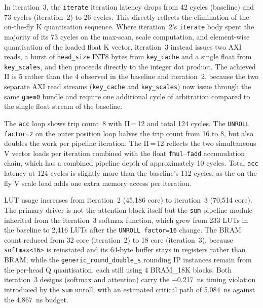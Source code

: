 In iteration~3, the \texttt{iterate} iteration latency drops from 42 cycles (baseline) and 73
cycles (iteration~2) to 26 cycles. This directly reflects the
elimination of the on-the-fly K quantisation sequence. Where
iteration~2's \texttt{iterate} body spent the majority of its 73
cycles on the max-scan, scale computation, and element-wise
quantisation of the loaded float K vector, iteration~3 instead
issues two AXI reads, a burst of \texttt{head\_size} INT8 bytes
from \texttt{key\_cache} and a single float from
\texttt{key\_scales}, and then proceeds directly to the integer dot
product. The achieved II is 5 rather than the 4 observed in the
baseline and iteration~2, because the two separate AXI read streams
(\texttt{key\_cache} and \texttt{key\_scales}) now issue through the
same \texttt{gmem0} bundle and require one additional cycle of
arbitration compared to the single float stream of the baseline.

The \texttt{acc} loop shows trip count~8 with II\,=\,12 and total
124 cycles. The \texttt{UNROLL factor=2} on the outer position loop
halves the trip count from 16 to 8, but also doubles the work per
pipeline iteration. The II\,=\,12 reflects the two simultaneous V
vector loads per iteration combined with the float
\texttt{fmul}--\texttt{fadd} accumulation chain, which has a combined
pipeline depth of approximately 10 cycles. Total \texttt{acc} latency
at 124 cycles is slightly more than the baseline's 112 cycles, as the
on-the-fly V scale load adds one extra memory access per iteration.

LUT usage increases
from iteration~2 (45,186 core) to iteration~3 (70,514 core). The
primary driver is not the attention block itself but the
\texttt{sum} pipeline module inherited from the iteration~3 softmax
function, which grew from 233 LUTs in the baseline to 2,416 LUTs
after the \texttt{UNROLL factor=16} change. The BRAM count reduced
from 32 core (iteration~2) to 18 core (iteration~3), because
\texttt{softmax<16>} is reinstated and its 64-byte buffer stays in
registers rather than BRAM, while the \texttt{generic\_round\_double\_s}
rounding IP instances remain from the per-head Q quantisation, each
still using 4 BRAM\_18K blocks. Both iteration~3 designs
(softmax and attention) carry the \SI{-0.217}{\nano\second} timing
violation introduced by the \texttt{sum} unroll, with an estimated
critical path of \SI{5.084}{\nano\second} against the
\SI{4.867}{\nano\second} budget.

